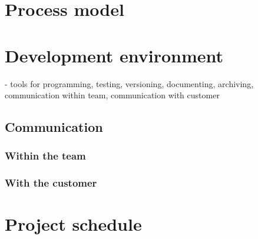 \documentclass[12pt, oneside]{memoir}
\begin{document}
\chapter{Process model}
\chapter{Development environment}
- tools for programming, testing, versioning, documenting, archiving, communication within team, communication with customer

\section{Communication}
\subsection{Within the team}
\subsection{With the customer}

\chapter{Project schedule}
\end{document}
